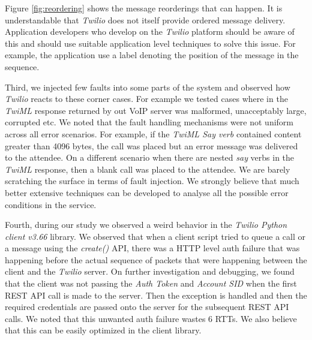 Figure {\ref{fig:reordering}} shows the message reorderings that can happen. It is understandable that \textit{Twilio} does not itself provide ordered message delivery. Application developers who develop on the \textit{Twilio} platform should be aware of this and should use suitable application level techniques to solve this issue. For example, the application use a label denoting the position of the message in the sequence. 

Third, we injected few faults into some parts of the system and observed how \textit{Twilio} reacts to these corner cases. For example we tested cases where in the \textit{TwiML} response returned by out VoIP server was malformed, unacceptably large, corrupted etc. We noted that the fault handling mechanisms were not uniform across all error scenarios. For example, if the \textit{TwiML Say verb} contained content greater than 4096 bytes, the call was placed but an error message was delivered to the attendee. On a different scenario when there are nested \textit{say} verbs in the \textit{TwiML} response, then a blank call was placed to the attendee. We are barely scratching the surface in terms of fault injection. We strongly believe that much better extensive techniques can be developed to analyse all the possible error conditions in the service.  

Fourth, during our study we observed a weird behavior in the \textit{Twilio Python client v3.66} library. We observed that when a client script tried to queue a call or a message using the \textit{create()} API, there was a HTTP level auth failure that was happening before the actual sequence of packets that were happening between the client and the \textit{Twilio} server. On further investigation and debugging, we found that the client was not passing the \textit{Auth Token} and \textit{Account SID} when the first REST API call is made to the server. Then the exception is handled and then the required credentials are passed onto the server for the subsequent REST API calls. We noted that this unwanted auth failure wastes 6 RTTs. We also believe that this can be easily optimized in the client library. 